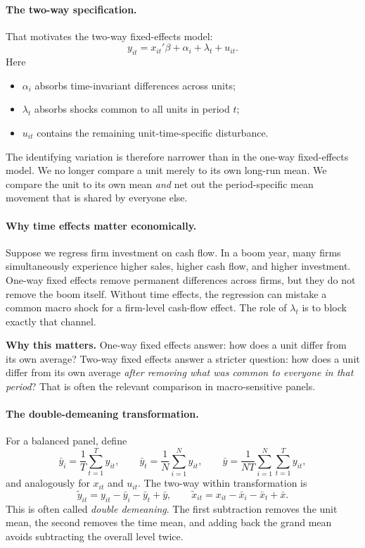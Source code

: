 \paragraph{The two-way specification.}
That motivates the two-way fixed-effects model:
\begin{equation}
y_{it} = x_{it}'\beta + \alpha_i + \lambda_t + u_{it}.
\label{eq:twfe}
\end{equation}
Here
\begin{itemize}
\item $\alpha_i$ absorbs time-invariant differences across units;
\item $\lambda_t$ absorbs shocks common to all units in period $t$;
\item $u_{it}$ contains the remaining unit-time-specific disturbance.
\end{itemize}
The identifying variation is therefore narrower than in the one-way fixed-effects model. We no longer compare a unit merely to its own long-run mean. We compare the unit to its own mean \emph{and} net out the period-specific mean movement that is shared by everyone else.

\paragraph{Why time effects matter economically.}
Suppose we regress firm investment on cash flow. In a boom year, many firms simultaneously experience higher sales, higher cash flow, and higher investment. One-way fixed effects remove permanent differences across firms, but they do not remove the boom itself. Without time effects, the regression can mistake a common macro shock for a firm-level cash-flow effect. The role of $\lambda_t$ is to block exactly that channel.

\begin{boxD}
\textbf{Why this matters.}
One-way fixed effects answer: how does a unit differ from its own average? Two-way fixed effects answer a stricter question: how does a unit differ from its own average \emph{after removing what was common to everyone in that period}? That is often the relevant comparison in macro-sensitive panels.
\end{boxD}

\paragraph{The double-demeaning transformation.}
For a balanced panel, define
\[
\bar{y}_i = \frac{1}{T}\sum_{t=1}^T y_{it},
\qquad
\bar{y}_t = \frac{1}{N}\sum_{i=1}^N y_{it},
\qquad
\bar{y} = \frac{1}{NT}\sum_{i=1}^N \sum_{t=1}^T y_{it},
\]
and analogously for $x_{it}$ and $u_{it}$. The two-way within transformation is
\begin{equation}
\tilde{y}_{it}=y_{it}-\bar{y}_i-\bar{y}_t+\bar{y},
\qquad
\tilde{x}_{it}=x_{it}-\bar{x}_i-\bar{x}_t+\bar{x}.
\label{eq:twfe_transform}
\end{equation}
This is often called \emph{double demeaning}. The first subtraction removes the unit mean, the second removes the time mean, and adding back the grand mean avoids subtracting the overall level twice.

